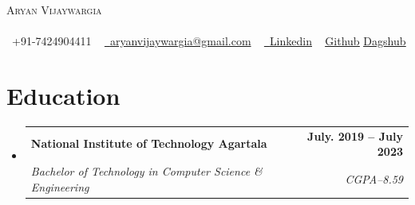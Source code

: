 \documentclass[letterpaper,11pt]{article}
\makeatletter
\newcommand{\resumeSubheading}[4]{
  \vspace{-2pt}\item
    \begin{tabular*}{1.0\textwidth}[t]{l@{\extracolsep{\fill}}r}
      \textbf{#1} & \textbf{\small #2} \\
      \textit{\small#3} & \textit{\small #4} \\
    \end{tabular*}\vspace{-7pt}
}
\newcommand{\resumeSubHeadingListStart}{\begin{itemize}[leftmargin=0.0in, label={}]}
\newcommand{\resumeSubHeadingListEnd}{\end{itemize}}
\makeatother
\begin{document}

\begin{center}
    {\Huge \scshape Aryan Vijaywargia} \\ \vspace{1pt}
     \\ \vspace{1pt}
    \small \raisebox{-0.1\height}\faPhone\ +91-7424904411 ~ \href{mailto:aryanvijaywargia@gmail.com}{\raisebox{-0.2\height}\faEnvelope\ {aryanvijaywargia@gmail.com}} ~ 
    \href{https://www.linkedin.com/in/aryan-vijaywargia/}{\raisebox{-0.2\height}\faLinkedin\ \underline{Linkedin}}  ~
    \href{https://github.com/aryanVijaywargia}{\raisebox{-0.2\height}\faGithub\underline{Github}}
    \href{https://dagshub.com/aryanVijaywargia}{\raisebox{-0.2\height}\faGithub\underline{Dagshub}}
    \vspace{-8pt}
\end{center}
\section{Education}
  \resumeSubHeadingListStart
    \resumeSubheading
      {National Institute of Technology Agartala}{July. 2019 -- July 2023}
      {Bachelor of Technology in Computer Science \& Engineering}{CGPA--8.59}
  \resumeSubHeadingListEnd

\end{document}
